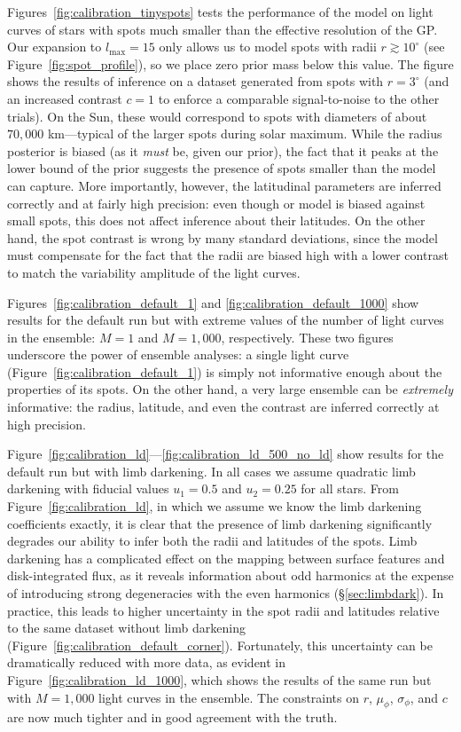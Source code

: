 \documentclass[modern]{aastex62}
\begin{document}
Figures~\ref{fig:calibration_tinyspots} tests the performance of the model
on light curves of stars with spots much smaller than the effective resolution
of the GP. Our expansion to $l_\mathrm{max} = 15$ only allows us to model spots
with radii $r \gtrsim 10^\circ$ (see Figure~\ref{fig:spot_profile}), so we
place zero prior mass below this value. The figure shows the results of inference
on a dataset generated from spots with $r = 3^\circ$ (and an increased
contrast $c = 1$ to enforce a comparable signal-to-noise to the other trials).
On the Sun, these would correspond to spots with diameters of about
$70{,}000$ km---typical of the larger spots during solar maximum.
While the radius posterior is biased (as it \emph{must} be, given our prior),
the fact that it peaks at the lower bound of the prior suggests the presence
of spots smaller than the model can capture. More importantly, however, the
latitudinal parameters are inferred correctly and at fairly high precision:
even though or model is biased against small spots, this does not affect
inference about their latitudes. On the other hand, the spot contrast is wrong
by many standard deviations, since the model must compensate for the fact
that the radii are biased high with a lower contrast to match the variability
amplitude of the light curves.

Figures~\ref{fig:calibration_default_1} and \ref{fig:calibration_default_1000}
show results for the default run but with extreme values of the number of
light curves in the ensemble: $M = 1$ and $M = 1{,}000$, respectively.
These two figures underscore the power of ensemble analyses: a single light
curve (Figure~\ref{fig:calibration_default_1}) is simply not informative
enough about the properties of its spots. On the other hand, a very large
ensemble can be \emph{extremely} informative: the radius, latitude, and even
the contrast are inferred correctly at high precision.

Figure~\ref{fig:calibration_ld}---\ref{fig:calibration_ld_500_no_ld}
show results for the default run but with limb darkening. In all cases
we assume quadratic limb darkening with fiducial values $u_1 = 0.5$
and $u_2 = 0.25$ for all stars. From Figure~\ref{fig:calibration_ld}, in which we
assume we know the limb darkening coefficients exactly, it is clear that
the presence of limb darkening significantly degrades our ability to
infer both the radii and latitudes of the spots. Limb darkening has a complicated
effect on the mapping between surface features and disk-integrated flux, as it
reveals information about odd harmonics at
the expense of introducing strong degeneracies with the even harmonics
(\S\ref{sec:limbdark}). In practice, this leads to higher uncertainty in
the spot radii and latitudes relative to the same dataset without limb
darkening (Figure~\ref{fig:calibration_default_corner}). Fortunately,
this uncertainty can be dramatically reduced with more data, as evident
in Figure~\ref{fig:calibration_ld_1000}, which shows the results of the
same run but with $M=1{,}000$ light curves in the ensemble. The constraints
on $r$, $\mu_\phi$, $\sigma_\phi$, and $c$ are now much tighter and in
good agreement with the truth.
\end{document}
